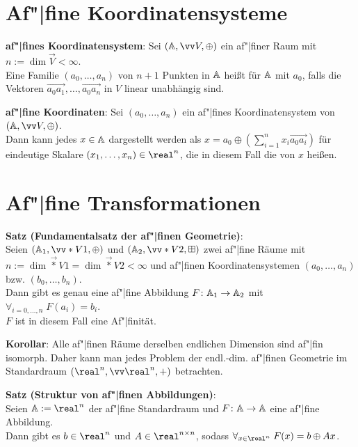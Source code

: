\pagebreak

\section{%
    Af"|fine Koordinatensysteme%
}

\textbf{af"|fines Koordinatensystem}:
Sei $(\AA, \vec{V}, \oplus)$ ein af"|finer Raum mit $n := \dim \vec{V} < \infty$.\\
Eine Familie $(a_0, \dotsc, a_n)$ von $n+1$ Punkten in $\AA$ heißt
 für $\AA$ mit  $a_0$, falls die
Vektoren $\vec{a_0a_1}, \dotsc, \vec{a_0a_n}$ in $V$ linear unabhängig sind.

\textbf{af"|fine Koordinaten}:
Sei $(a_0, \dotsc, a_n)$ ein af"|fines Koordinatensystem von $(\AA, \vec{V}, \oplus)$.\\
Dann kann jedes $x \in \AA$ dargestellt werden als
$x = a_0 \oplus (\sum_{i=1}^n x_i \vec{a_0a_i})$
für eindeutige Skalare $(x_1, \dotsc, x_n) \in \real^n$, die in diesem Fall die
 von $x$ heißen.

\section{%
    Af"|fine Transformationen%
}

\textbf{Satz (Fundamentalsatz der af"|finen Geometrie)}:\\
Seien $(\AA_1, \vec*{V}{1}, \oplus)$ und $(\AA_2, \vec*{V}{2}, \boxplus)$ zwei af"|fine Räume
mit $n := \dim \vec*{V}{1} = \dim \vec*{V}{2} < \infty$
und af"|finen Koordinatensystemen $(a_0, \dotsc, a_n)$ bzw. $(b_0, \dotsc, b_n)$.\\
Dann gibt es genau eine af"|fine Abbildung $F\colon \AA_1 \to \AA_2$ mit
$\forall_{i=0,\dotsc,n}\; F(a_i) = b_i$.\\
$F$ ist in diesem Fall eine Af"|finität.

\textbf{Korollar}:
Alle af"|finen Räume derselben endlichen Dimension sind af"|fin isomorph.
Daher kann man jedes Problem der endl.-dim. af"|finen Geometrie im Standardraum
$(\real^n, \vec{\real}^n, +)$ betrachten.

\linie

\textbf{Satz (Struktur von af"|finen Abbildungen)}:\\
Seien $\AA := \real^n$ der af"|fine Standardraum und
$F\colon \AA \to \AA$ eine af"|fine Abbildung.\\
Dann gibt es $b \in \real^n$ und $A \in \real^{n \times n}$, sodass
$\forall_{x \in \real^n}\; F(x) = b \oplus Ax$.

